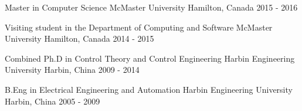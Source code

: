 \begin{cventries}
	\cvedu
    {Master in Computer Science}
    {McMaster University}
    {Hamilton, Canada}
    {2015 - 2016}
   
    \cvedu
    {Visiting student in the Department of Computing and Software}
    {McMaster University}
    {Hamilton, Canada}
    {2014 - 2015}
   
	\cvedu
	{Combined Ph.D in Control Theory and Control Engineering}
	{Harbin Engineering University}
	{Harbin, China}
	{2009 - 2014}
  
    \cvedu
    {B.Eng in Electrical Engineering and Automation}
    {Harbin Engineering University}
    {Harbin, China}
    {2005 - 2009}

\end{cventries}
